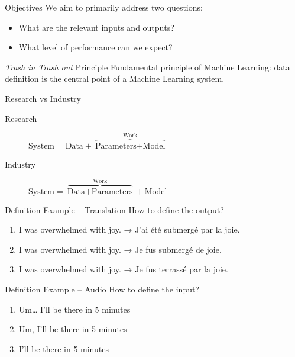 \begin{frame}{Objectives}
  We aim to primarily address two questions:
  \begin{itemize}
    \item What are the relevant inputs and outputs?
    \item What level of performance can we expect?
  \end{itemize}
\end{frame}

\begin{frame}{\textit{Trash in Trash out} Principle}
  Fundamental principle of Machine Learning: data definition is the \alert{central} point of a Machine Learning system.
\end{frame}

\begin{frame}{Research vs Industry}
  \begin{description}
    \item[Research] $\text{System} = \text{Data} + \overbrace{\text{Parameters} + \text{Model}}^{\text{Work}}$
    \item[Industry] $\text{System} = \overbrace{\text{Data} + \text{Parameters}}^{\text{Work}} + \text{Model}$
  \end{description}
\end{frame}

\begin{frame}{Definition Example – Translation}
  How to define the output?
  \begin{enumerate}
    \item I was overwhelmed with joy. → J'ai été submergé par la joie.
    \item I was overwhelmed with joy. → Je fus submergé de joie.
    \item I was overwhelmed with joy. → Je fus terrassé par la joie.
  \end{enumerate}
\end{frame}

\begin{frame}{Definition Example – Audio}
  How to define the input?
  \begin{enumerate}
    \item Um… I'll be there in 5 minutes
    \item Um, I'll be there in 5 minutes
    \item I'll be there in 5 minutes
  \end{enumerate}
\end{frame}

